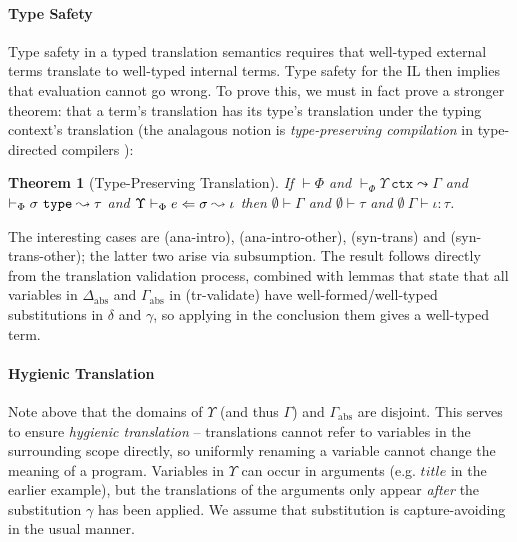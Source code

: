 \documentclass[preprint]{sigplanconf}
\newtheorem{theorem}{Theorem}
\newenvironment{proof-sketch}{\noindent{\emph{Proof Sketch.}}}{\qed}
\begin{document}
\paragraph{Type Safety}
Type safety in a typed translation semantics requires that well-typed external terms translate to well-typed internal terms. Type safety for the IL \cite{pfpl} then implies that evaluation cannot go wrong. To prove this, we must in fact prove a stronger theorem: that a term's translation has its type's translation under the typing context's translation (the analagous notion is \emph{type-preserving compilation} in type-directed compilers \cite{tarditi+:til-OLD}):%

\vspace{-4px}\begin{theorem}[Type-Preserving Translation]
\label{thm:type-preserving-translation}
If $\vdash \Phi$ and $\vdash_\Phi \Upsilon~\mathtt{ctx} \leadsto \Gamma$ and $\vdash_\Phi \sigma~\mathtt{type} \leadsto \tau$ and $\Upsilon \vdash_{\Phi} e \Leftarrow \sigma \leadsto \iota$ then $\emptyset \vdash \Gamma$ and $\emptyset \vdash \tau$ and $\emptyset~\Gamma \vdash \iota : \tau$.
\end{theorem}
\begin{proof-sketch}
The interesting cases are (ana-intro), (ana-intro-other), (syn-trans) and (syn-trans-other); the latter two arise via subsumption. The result follows directly from the translation validation process, combined with lemmas that state that all variables in $\Delta_\text{abs}$ and $\Gamma_\text{abs}$ in (tr-validate) have well-formed/well-typed substitutions in $\delta$ and $\gamma$,  so applying in the conclusion them gives a well-typed term.
\end{proof-sketch}

\paragraph{Hygienic Translation} 
Note above that the domains of $\Upsilon$ (and thus $\Gamma$)  and $\Gamma_\text{abs}$ are disjoint. This serves to ensure \emph{hygienic translation} -- translations cannot refer to variables in the surrounding scope directly, so uniformly renaming a variable cannot change the meaning of a program. Variables in $\Upsilon$ can  occur in arguments (e.g. $title$ in the earlier example), but the translations of the arguments only appear \emph{after} the substitution $\gamma$ has been applied. We assume that substitution is capture-avoiding in the usual manner. %
\end{document}
